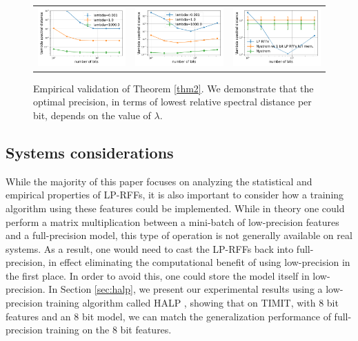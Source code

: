\begin{figure}
	\centering
	\begin{tabular}{c c c}
		\includegraphics[width=0.3\linewidth]{figures/theory_fixed_n_feat.pdf} &
		\includegraphics[width=0.3\linewidth]{figures/theory_fixed_memory.pdf} &
		\includegraphics[width=0.3\linewidth]{figures/theory_fixed_memory_generous_mem_to_nystrom_lamb_0001.pdf} 
	\end{tabular}
	\caption{Empirical validation of Theorem \ref{thm2}.  We demonstrate that the optimal precision, in terms of lowest relative spectral distance per bit, depends on the value of $\lambda$.}
	\label{fig:theo_validation}
\end{figure}

\subsection{Systems considerations}
While the majority of this paper focuses on analyzing the statistical and empirical properties of LP-RFFs, it is also important to consider how a training algorithm using these features could be implemented. While in theory one could perform a matrix multiplication between a mini-batch of low-precision features and a full-precision model, this type of operation is not generally available on real systems. As a result, one would need to cast the LP-RFFs back into full-precision, in effect eliminating the computational benefit of using low-precision in the first place.  In order to avoid this, one could store the model itself in low-precision. In Section \ref{sec:halp}, we present our experimental results using a low-precision training algorithm called HALP \citep{halp18}, showing that on TIMIT, with 8 bit features and an 8 bit model, we can match the generalization performance of full-precision training on the 8 bit features.

